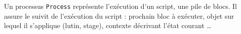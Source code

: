 % 
% 
% 
% 
% 

Un processus \texttt{Process} représente l'exécution d'un script, une pile de blocs. Il assure le suivit de l'exécution du script : prochain bloc à exécuter, objet sur lequel il s'applique (lutin, stage), contexte décrivant l'état courant \ldots

